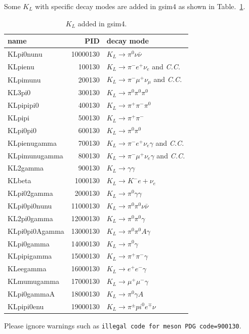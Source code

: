 \documentclass[a4paper,12pt]{article}
\begin{document}
 Some $K_L$ with specific decay modes are added in gsim4 as shown in
 Table.~\ref{tab:gsim4KL}.
 \begin{table}[H]
  \caption{$K_L$ added in gsim4.\label{tab:gsim4KL}}
  \begin{tabular}{l|rl}
   name&PID &decay mode \\\hline
   KLpi0nunu&10000130 &$K_L\to\pi^0\nu\bar\nu$ \\
   KLpienu&100130 &$K_L\to\pi^-e^+\nu_e$ and {\it C.C.}\\
   KLpimunu&200130 &$K_L\to\pi^-\mu^+\nu_\mu$ and {\it C.C.} \\
   KL3pi0&300130 &$K_L\to\pi^0\pi^0\pi^0$\\ 
   KLpipipi0&400130 &$K_L\to\pi^+\pi^-\pi^0$\\ 
   KLpipi&500130 &$K_L\to\pi^+\pi^-$\\  
   KLpi0pi0&600130 &$K_L\to\pi^0\pi^0$\\  
   KLpienugamma&700130 &$K_L\to\pi^-e^+\nu_e\gamma$ and {\it C.C.}\\
   KLpimunugamma&800130 &$K_L\to\pi^-\mu^+\nu_e\gamma$ and {\it C.C.}\\
   KL2gamma&900130 &$K_L\to\gamma\gamma$\\
   KLbeta&1000130 &$K_L\to K^- e+\nu_e$\\
   KLpi02gamma&2000130 &$K_L\to\pi^0\gamma\gamma$\\
   KLpi0pi0nunu&11000130 &$K_L\to\pi^0\pi^0\nu\bar\nu$\\
   KL2pi0gamma&12000130 &$K_L\to\pi^0\pi^0\gamma$\\
   KLpi0pi0Agamma&13000130 &$K_L\to\pi^0\pi^0A\gamma$\\
   KLpi0gamma&14000130 &$K_L\to\pi^0\gamma$\\
   KLpipigamma&15000130 &$K_L\to\pi^+\pi^-\gamma$\\
   KLeegamma&16000130 &$K_L\to e^+e^-\gamma$\\
   KLmumugamma&17000130 &$K_L\to\mu^+\mu^-\gamma$ \\
   KLpi0gammaA&18000130 &$K_L\to\pi^0\gamma A$ \\
   KLpipi0enu&19000130 &$K_L\to\pi^\pm pi^0 e^\mp\nu$
  \end{tabular}
 \end{table}
 Please ignore warnings such as 
 {\tt illegal code for meson  PDG code=900130}.
\end{document}
